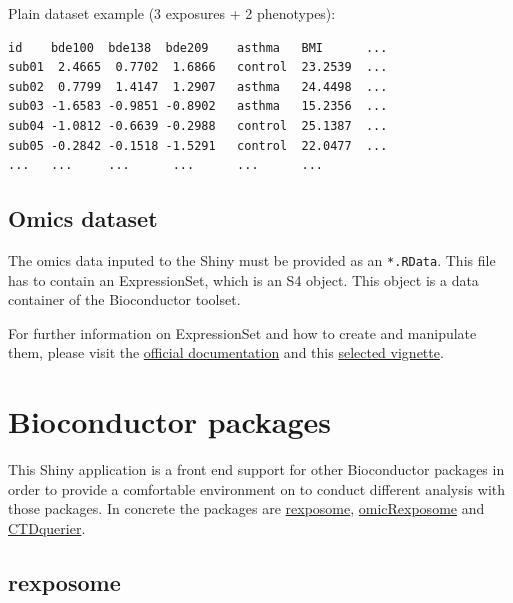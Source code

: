 \documentclass[
]{book}
\begin{document}
Plain dataset example (3 exposures + 2 phenotypes):

\begin{verbatim}
id    bde100  bde138  bde209    asthma   BMI      ...
sub01  2.4665  0.7702  1.6866   control  23.2539  ...
sub02  0.7799  1.4147  1.2907   asthma   24.4498  ...  
sub03 -1.6583 -0.9851 -0.8902   asthma   15.2356  ... 
sub04 -1.0812 -0.6639 -0.2988   control  25.1387  ... 
sub05 -0.2842 -0.1518 -1.5291   control  22.0477  ...
...   ...     ...      ...      ...      ...
\end{verbatim}

\hypertarget{omicsds}{%
\section{Omics dataset}\label{omicsds}}

The omics data inputed to the Shiny must be provided as an \texttt{*.RData}. This file has to contain an ExpressionSet, which is an S4 object. This object is a data container of the Bioconductor toolset.

For further information on ExpressionSet and how to create and manipulate them, please visit the \href{https://www.bioconductor.org/packages/devel/bioc/vignettes/Biobase/inst/doc/ExpressionSetIntroduction.pdf}{official documentation} and this \href{https://kasperdanielhansen.github.io/genbioconductor/html/ExpressionSet.html}{selected vignette}.

\hypertarget{bioconductor-packages}{%
\chapter{Bioconductor packages}\label{bioconductor-packages}}

This Shiny application is a front end support for other Bioconductor packages in order to provide a comfortable environment on to conduct different analysis with those packages. In concrete the packages are \href{https://www.bioconductor.org/packages/release/bioc/html/rexposome.html}{rexposome}, \href{https://bioconductor.org/packages/release/bioc/html/omicRexposome.html}{omicRexposome} and \href{http://www.bioconductor.org/packages/release/bioc/html/CTDquerier.html}{CTDquerier}.

\hypertarget{rexposome}{%
\section{rexposome}\label{rexposome}}
\end{document}
